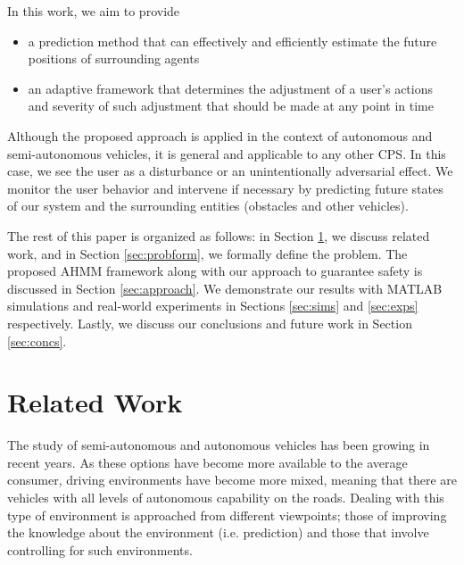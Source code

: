 \documentclass[letterpaper, 10 pt, conference]{ieeeconf}  %
\begin{document}
     In this work, we aim to provide
    \begin{itemize}
    \item{a prediction method that can effectively and efficiently estimate the future positions of surrounding agents}
    \item{an adaptive framework that determines the adjustment of a user's actions and severity of such adjustment that should be made at any point in time}
    \end{itemize}
  
   Although the proposed approach is applied in the context of autonomous and semi-autonomous vehicles, it is general and applicable to any other CPS. In this case, we see the user as a disturbance or an unintentionally adversarial effect. We monitor the user behavior and intervene if necessary by predicting future states of our system and the surrounding entities (obstacles and other vehicles).    
    
    The rest of this paper is organized as follows: in Section \ref{sec:relatedwork}, we discuss related work, and in Section \ref{sec:probform}, we formally define the problem. The proposed AHMM framework along with our approach to guarantee safety is discussed in Section \ref{sec:approach}. We demonstrate our results with MATLAB simulations and real-world experiments in Sections \ref{sec:sims} and \ref{sec:exps} respectively. Lastly, we discuss our conclusions and future work in Section \ref{sec:concs}.

    

\section{Related Work} \label{sec:relatedwork}

The study of semi-autonomous and autonomous vehicles has been growing in recent years. As these options have become more available to the average consumer, driving environments have become more mixed, meaning that there are vehicles with all levels of autonomous capability on the roads. Dealing with this type of environment is approached from different viewpoints; those of improving the knowledge about the environment (i.e. prediction) and those that involve controlling for such environments.
\end{document}
